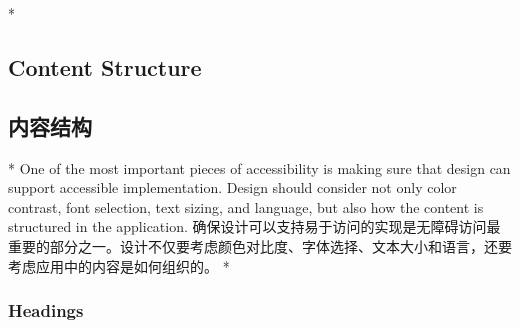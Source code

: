 \begin{paracol}{2} 
 
\switchcolumn[0]*%
\subsection{Content Structure}
\switchcolumn
\subsection{内容结构}
\switchcolumn[0]*%
One of the most important pieces of accessibility is making sure that
design can support accessible implementation. Design should consider not
only color contrast, font selection, text sizing, and language, but also
how the content is structured in the application.
\switchcolumn
确保设计可以支持易于访问的实现是无障碍访问最重要的部分之一。设计不仅要考虑颜色对比度、字体选择、文本大小和语言，还要考虑应用中的内容是如何组织的。
\switchcolumn[0]*%
\subsubsection{Headings}
\switchcolumn

\end{paracol}
